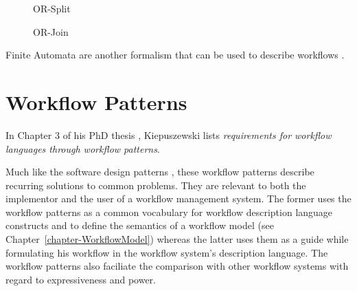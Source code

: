 \begin{figure}[htb]
  \begin{minipage}{0.45\textwidth}
    \begin{center}
      \caption[The \emph{OR-Split} workflow primitive]{OR-Split}
      \label{figure-ORSplit}
    \end{center}
  \end{minipage}
  \hfill
  \begin{minipage}{0.45\textwidth}
    \begin{center}
      \caption[The \emph{OR-Join} workflow primitive]{OR-Join}
      \label{figure-ORJoin}
    \end{center}
  \end{minipage}
\end{figure}

Finite Automata are another formalism that can be used to describe workflows \cite{ARK03}.

\section{Workflow Patterns}
\label{section-WorkflowPatterns}

In Chapter 3 of his PhD thesis \cite{BK03}, Kiepuszewski lists
\emph{requirements for workflow languages through workflow patterns}.

Much like the software design patterns \cite{GoF94}, these workflow patterns
describe recurring solutions to common problems. They are relevant to both the
implementor and the user of a workflow management system. The former uses the
workflow patterns as a common vocabulary for workflow description language
constructs and to define the semantics of a workflow model (see
Chapter~\ref{chapter-WorkflowModel}) whereas the latter uses them as a guide while
formulating his workflow in the workflow system's description language. The
workflow patterns also faciliate the comparison with other workflow systems
with regard to expressiveness and power.
 
